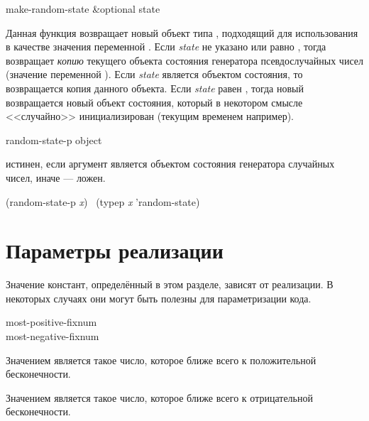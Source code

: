 \begin{defun}[Функция]
make-random-state &optional state

Данная функция возвращает новый объект типа , подходящий для
использования в качестве значения переменной .
Если \emph{state} не указано или равно {\false}, тогда 
возвращает \emph{копию} текущего объекта состояния генератора псевдослучайных чисел
(значение переменной ). Если \emph{state} является объектом
состояния, то возвращается копия данного объекта.
Если \emph{state} равен {\true}, тогда новый возвращается новый объект
состояния, который в некотором смысле <<случайно>> инициализирован (текущим
временем например).
\end{defun}

\begin{defun}[Функция]
random-state-p object

 истинен, если аргумент является объектом состояния
генератора случайных чисел, иначе --- ложен.
\begin{lisp}
(random-state-p \emph{x}) \EQ\ (typep \emph{x} 'random-state)
\end{lisp}
\end{defun}

\section{Параметры реализации}

Значение констант, определённый в этом разделе, зависят от реализации. В
некоторых случаях они могут быть полезны для параметризации кода.

\begin{defun}[Константа]
most-positive-fixnum \\
most-negative-fixnum

Значением  является такое число, которое ближе всего
к положительной бесконечности.

Значением  является такое число, которое ближе всего
к отрицательной бесконечности.
\end{defun}

